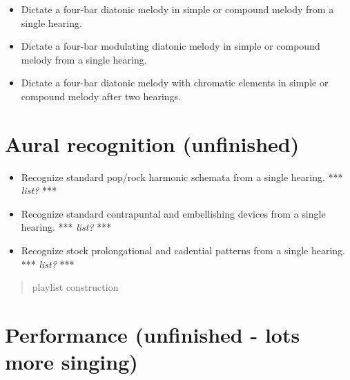 \begin{itemize}
\item Dictate a four-bar diatonic melody in simple or compound melody from a single hearing.

\item Dictate a four-bar modulating diatonic melody in simple or compound melody from a single hearing.

\item Dictate a four-bar diatonic melody with chromatic elements in simple or compound melody after two hearings.

\end{itemize}

\section{Aural recognition (unfinished)}
\label{auralrecognitionunfinished}

\begin{itemize}
\item Recognize standard pop\slash rock harmonic schemata from a single hearing. *** \emph{list?} ***

\item Recognize standard contrapuntal and embellishing devices from a single hearing. *** \emph{list?} ***

\item Recognize stock prolongational and cadential patterns from a single hearing. *** \emph{list?} ***

\end{itemize}

\begin{quote}

playlist construction
\end{quote}

\section{Performance (unfinished - lots more singing)}
\label{performanceunfinished-lotsmoresinging}

